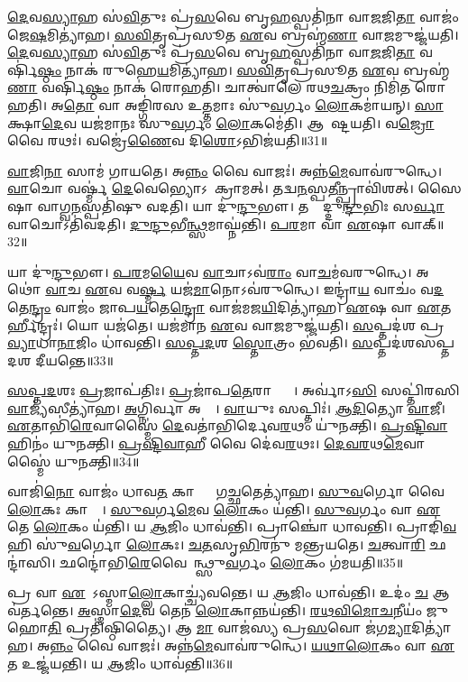 \ul{𑌦𑍇}𑌵\ul{𑌸𑍍𑌯𑌾}𑌹 𑌸॑\ul{𑌵𑌿}𑌤𑍁𑌃 𑌪𑍍𑌰॑\ul{𑌸}𑌵𑍇 𑌬𑍃\ul{𑌹}𑌸𑍍𑌪𑌤𑌿॑𑌨𑌾 𑌵𑌾\ul{𑌜}𑌜𑌿\ul{𑌤𑌾} 𑌵𑌾𑌜𑌂॑ 𑌜𑍇\ul{𑌷}𑌮𑌿𑌤𑍍𑌯𑌾॑𑌹।
\ul{𑌸}\ul{𑌵𑌿}𑌤𑍃𑌪𑍍𑌰॑𑌸𑍂𑌤 \ul{𑌏}𑌵 𑌬𑍍𑌰𑌹𑍍𑌮॑\ul{𑌣𑌾} 𑌵𑌾\ul{𑌜}𑌮𑍁𑌜𑍍𑌜॑𑌯𑌤𑌿।
\ul{𑌦𑍇}𑌵\ul{𑌸𑍍𑌯𑌾}𑌹 𑌸॑\ul{𑌵𑌿}𑌤𑍁𑌃 𑌪𑍍𑌰॑\ul{𑌸}𑌵𑍇 𑌬𑍃\ul{𑌹}𑌸𑍍𑌪𑌤𑌿॑𑌨𑌾 𑌵𑌾\ul{𑌜}𑌜𑌿\ul{𑌤𑌾} 𑌵𑌰𑍍\mbox{}𑌷𑌿॑\ul{𑌷𑍍𑌠𑌂} 𑌨𑌾𑌕॑ 𑌰𑍁𑌹𑍇\ul{𑌯}𑌮𑌿𑌤𑍍𑌯𑌾॑𑌹।
\ul{𑌸}\ul{𑌵𑌿}𑌤𑍃𑌪𑍍𑌰॑𑌸𑍂𑌤 \ul{𑌏}𑌵 𑌬𑍍𑌰𑌹𑍍𑌮॑\ul{𑌣𑌾} 𑌵𑌰𑍍\mbox{}𑌷𑌿॑\ul{𑌷𑍍𑌠𑌂} 𑌨𑌾𑌕॑ 𑌰𑍋𑌹𑌤𑌿।
𑌚𑌾𑌤𑍍𑌵𑌾॑𑌲𑍇 𑌰𑌥\ul{𑌚}𑌕𑍍𑌰𑌂 𑌨𑌿𑌮𑌿॑𑌤 𑌰𑍋𑌹𑌤𑌿।
𑌅\ul{𑌤𑍋} 𑌵𑌾 𑌅𑌙𑍍𑌗𑌿॑𑌰𑌸 𑌉\ul{𑌤𑍍𑌤}𑌮𑌾𑌃 𑌸𑍁॑\ul{𑌵}𑌰𑍍𑌗𑌂 \ul{𑌲𑍋}𑌕𑌮𑌾॑𑌯𑌨𑍍।
\ul{𑌸𑌾}𑌕𑍍𑌷𑌾\ul{𑌦𑍇}𑌵 𑌯𑌜॑𑌮𑌾𑌨𑌃 𑌸𑍁\ul{𑌵}𑌰𑍍𑌗𑌂 \ul{𑌲𑍋}𑌕𑌮𑍇॑𑌤𑌿।
𑌆𑌵𑍇᳚𑌷𑍍𑌟𑌯𑌤𑌿।
𑌵\ul{𑌜𑍍𑌰𑍋} 𑌵𑍈 𑌰𑌥𑌃॑।
𑌵𑌜𑍍𑌰𑍇॑\ul{𑌣𑍈}𑌵 𑌦𑌿\ul{𑌶𑍋}\-𑌽𑌭𑌿𑌜॑𑌯𑌤𑌿॥31॥

\ul{𑌵𑌾}𑌜𑌿\ul{𑌨𑌾}\ul{} 𑌸𑌾𑌮॑ 𑌗𑌾𑌯𑌤𑍇।
𑌅\ul{𑌨𑍍𑌨𑌂} 𑌵𑍈 𑌵𑌾𑌜𑌃॑।
𑌅𑌨𑍍𑌨॑\ul{𑌮𑍇}𑌵𑌾𑌵॑𑌰𑍁𑌨𑍍𑌧𑍇।
\ul{𑌵𑌾}𑌚𑍋 𑌵𑌰𑍍𑌷𑍍𑌮॑ \ul{𑌦𑍇}𑌵𑍇𑌭𑍍𑌯𑍋\-𑌽𑌪𑌾᳚𑌕𑍍𑌰𑌾𑌮𑌤𑍍।
𑌤𑌦𑍍𑌵\ul{𑌨}𑌸𑍍𑌪\ul{𑌤𑍀}𑌨𑍍𑌪𑍍𑌰𑌾𑌵𑌿॑𑌶𑌤𑍍।
𑌸𑍈𑌷𑌾 𑌵𑌾𑌗𑍍𑌵\ul{𑌨}𑌸𑍍𑌪𑌤𑌿॑𑌷𑍁 𑌵𑌦𑌤𑌿।
𑌯𑌾 𑌦𑍁॑\ul{𑌨𑍍𑌦𑍁}𑌭𑍗।
𑌤𑌸𑍍𑌮𑌾᳚𑌦𑍍𑌦𑍁\ul{𑌨𑍍𑌦𑍁}𑌭𑌿𑌃 𑌸\ul{𑌰𑍍𑌵𑌾} 𑌵𑌾𑌚𑍋\-𑌽𑌤𑌿॑𑌵𑌦𑌤𑌿।
\ul{𑌦𑍁}\ul{𑌨𑍍𑌦𑍁}𑌭𑍀\ul{𑌨𑍍𑌥𑍍𑌸}𑌮𑌾𑌘𑍍𑌨॑𑌨𑍍𑌤𑌿।
\ul{𑌪}\ul{𑌰}𑌮𑌾 𑌵𑌾 \ul{𑌏}𑌷𑌾 𑌵𑌾𑌕𑍍॥32॥

𑌯𑌾 𑌦𑍁॑\ul{𑌨𑍍𑌦𑍁}𑌭𑍗।
\ul{𑌪}\ul{𑌰}𑌮\ul{𑌯𑍈}𑌵 \ul{𑌵𑌾}𑌚𑌾\-𑌽𑌵॑\ul{𑌰𑌾𑌂} 𑌵𑌾\ul{𑌚}𑌮॑𑌵𑌰𑍁𑌨𑍍𑌧𑍇।
𑌅𑌥𑍋॑ \ul{𑌵𑌾}𑌚 \ul{𑌏}𑌵 𑌵\ul{𑌰𑍍𑌷𑍍𑌮} 𑌯𑌜॑\ul{𑌮𑌾}𑌨𑍋\-𑌽𑌵॑𑌰𑍁𑌨𑍍𑌧𑍇।
𑌇𑌨𑍍𑌦𑍍𑌰𑌾॑\ul{𑌯} 𑌵𑌾𑌚𑌂॑ 𑌵\ul{𑌦}𑌤𑍇\ul{𑌨𑍍𑌦𑍍𑌰𑌂} 𑌵𑌾𑌜𑌂॑ 𑌜𑌾𑌪\ul{𑌯}𑌤𑍇\ul{𑌨𑍍𑌦𑍍𑌰𑍋} 𑌵𑌾𑌜॑𑌮𑌜\ul{𑌯𑌿}𑌦𑌿𑌤𑍍𑌯𑌾॑𑌹।
\ul{𑌏}𑌷 𑌵𑌾 \ul{𑌏}𑌤𑌰𑍍\mbox{}𑌹𑍀𑌨𑍍𑌦𑍍𑌰𑌃॑।
𑌯𑍋 𑌯𑌜॑𑌤𑍇।
𑌯𑌜॑𑌮𑌾𑌨 \ul{𑌏}𑌵 𑌵𑌾\ul{𑌜}𑌮𑍁𑌜𑍍𑌜॑𑌯𑌤𑌿।
\ul{𑌸}𑌪𑍍𑌤𑌦॑𑌶 𑌪𑍍𑌰\ul{𑌵𑍍𑌯𑌾}𑌧𑌾\ul{𑌨𑌾}𑌜𑌿𑌂 𑌧𑌾॑𑌵𑌨𑍍𑌤𑌿।
\ul{𑌸}\ul{𑌪𑍍𑌤}\ul{𑌦}𑌶 \ul{𑌸𑍍𑌤𑍋}𑌤𑍍𑌰𑌂 𑌭॑𑌵𑌤𑌿।
\ul{𑌸}𑌪𑍍𑌤𑌦॑𑌶𑌸𑌪𑍍𑌤𑌦𑌶 𑌦𑍀𑌯𑌨𑍍𑌤𑍇॥33॥

\ul{𑌸}\ul{𑌪𑍍𑌤}\ul{𑌦}𑌶𑌃 \ul{𑌪𑍍𑌰}𑌜𑌾𑌪॑𑌤𑌿𑌃।
\ul{𑌪𑍍𑌰}𑌜𑌾॑𑌪\ul{𑌤𑍇}𑌰𑌾𑌪𑍍𑌤𑍍𑌯𑍈᳚।
𑌅𑌰𑍍𑌵𑌾॑𑌽\ul{𑌸𑌿} 𑌸𑌪𑍍𑌤𑌿॑𑌰𑌸𑌿 \ul{𑌵𑌾}𑌜𑍍𑌯॑𑌸𑍀𑌤𑍍𑌯𑌾॑𑌹।
\ul{𑌅}𑌗𑍍𑌨𑌿𑌰𑍍𑌵𑌾 𑌅𑌰𑍍𑌵𑌾᳚।
\ul{𑌵𑌾}𑌯𑍁𑌃 𑌸𑌪𑍍𑌤𑌿𑌃॑।
\ul{𑌆}\ul{𑌦𑌿}𑌤𑍍𑌯𑍋 \ul{𑌵𑌾}𑌜𑍀।
\ul{𑌏}𑌤𑌾𑌭𑌿॑\ul{𑌰𑍇}𑌵𑌾𑌸𑍍𑌮𑍈॑ \ul{𑌦𑍇}𑌵𑌤𑌾॑𑌭𑌿𑌰𑍍𑌦𑍇𑌵\ul{𑌰}𑌥𑌂 𑌯𑍁॑𑌨𑌕𑍍𑌤𑌿।
\ul{𑌪𑍍𑌰}\ul{𑌷𑍍𑌟𑌿}\ul{𑌵𑌾}𑌹𑌿𑌨𑌂॑ 𑌯𑍁𑌨𑌕𑍍𑌤𑌿।
\ul{𑌪𑍍𑌰}\ul{𑌷𑍍𑌟𑌿}\ul{𑌵𑌾}𑌹𑍀 𑌵𑍈 𑌦𑍇॑𑌵\ul{𑌰}𑌥𑌃।
\ul{𑌦𑍇}\ul{𑌵}\ul{𑌰}𑌥\ul{𑌮𑍇}𑌵𑌾𑌸𑍍𑌮𑍈॑ 𑌯𑍁𑌨𑌕𑍍𑌤𑌿॥34॥

𑌵𑌾𑌜𑌿॑\ul{𑌨𑍋} 𑌵𑌾𑌜𑌂॑ 𑌧𑌾𑌵\ul{𑌤} 𑌕𑌾𑌷𑍍𑌠𑌾𑌂᳚ 𑌗\ul{𑌚𑍍𑌛}𑌤𑍇𑌤𑍍𑌯𑌾॑𑌹।
\ul{𑌸𑍁}\ul{𑌵}𑌰𑍍𑌗𑍋 𑌵𑍈 \ul{𑌲𑍋}𑌕𑌃 𑌕𑌾𑌷𑍍𑌠𑌾᳚।
\ul{𑌸𑍁}\ul{𑌵}𑌰𑍍𑌗\ul{𑌮𑍇}𑌵 \ul{𑌲𑍋}𑌕𑌂 𑌯॑𑌨𑍍𑌤𑌿।
\ul{𑌸𑍁}\ul{𑌵}𑌰𑍍𑌗𑌂 𑌵𑌾 \ul{𑌏}𑌤𑍇 \ul{𑌲𑍋}𑌕𑌂 𑌯॑𑌨𑍍𑌤𑌿।
𑌯 \ul{𑌆}𑌜𑌿𑌂 𑌧𑌾𑌵॑𑌨𑍍𑌤𑌿।
𑌪𑍍𑌰𑌾𑌞𑍍𑌚𑍋॑ 𑌧𑌾𑌵𑌨𑍍𑌤𑌿।
𑌪𑍍𑌰𑌾𑌙𑌿॑\ul{𑌵} 𑌹𑌿 𑌸𑍁॑\ul{𑌵}𑌰𑍍𑌗𑍋 \ul{𑌲𑍋}𑌕𑌃।
\ul{𑌚}\ul{𑌤}𑌸𑍃\ul{𑌭𑌿}𑌰𑌨𑍁॑ 𑌮𑌨𑍍𑌤𑍍𑌰𑌯𑌤𑍇।
\ul{𑌚}𑌤𑍍𑌵𑌾\ul{𑌰𑌿} 𑌛𑌨𑍍𑌦𑌾॑𑌸𑌿।
𑌛𑌨𑍍𑌦𑍋॑𑌭𑌿\ul{𑌰𑍇}𑌵𑍈𑌨𑌾᳚𑌨𑍍𑌥𑍍𑌸𑍁\ul{𑌵}𑌰𑍍𑌗𑌂 \ul{𑌲𑍋}𑌕𑌂 𑌗॑𑌮𑌯𑌤𑌿॥35॥

𑌪𑍍𑌰 𑌵𑌾 \ul{𑌏}𑌤𑍇᳚\-𑌽𑌸𑍍𑌮𑌾\ul{𑌲𑍍𑌲𑍋}𑌕𑌾𑌚𑍍𑌚𑍍𑌯॑𑌵𑌨𑍍𑌤𑍇।
𑌯 \ul{𑌆}𑌜𑌿𑌂 𑌧𑌾𑌵॑𑌨𑍍𑌤𑌿।
𑌉𑌦𑌂॑ \ul{𑌚} 𑌆𑌵॑𑌰𑍍𑌤𑌨𑍍𑌤𑍇।
\ul{𑌅}𑌸𑍍𑌮𑌾\ul{𑌦𑍇}𑌵 𑌤𑍇𑌨॑ \ul{𑌲𑍋}𑌕𑌾𑌨𑍍𑌨𑌯॑𑌨𑍍𑌤𑌿।
\ul{𑌰}\ul{𑌥}\ul{𑌵𑌿}\ul{𑌮𑍋}\ul{𑌚}𑌨𑍀𑌯𑌂॑ 𑌜𑍁𑌹𑍋\ul{𑌤𑌿} 𑌪𑍍𑌰𑌤𑌿॑\-𑌷𑍍𑌠𑌿𑌤𑍍𑌯𑍈।
𑌆 \ul{𑌮𑌾} 𑌵𑌾𑌜॑𑌸𑍍𑌯 𑌪𑍍𑌰\ul{𑌸}𑌵𑍋 𑌜॑𑌗\ul{𑌮𑍍𑌯𑌾}𑌦𑌿𑌤𑍍𑌯𑌾॑𑌹।
𑌅\ul{𑌨𑍍𑌨𑌂} 𑌵𑍈 𑌵𑌾𑌜𑌃॑।
𑌅𑌨𑍍𑌨॑\ul{𑌮𑍇}𑌵𑌾𑌵॑𑌰𑍁𑌨𑍍𑌧𑍇।
\ul{𑌯}\ul{𑌥𑌾}\ul{𑌲𑍋}𑌕𑌂 𑌵𑌾 \ul{𑌏}𑌤 𑌉𑌜𑍍𑌜॑𑌯𑌨𑍍𑌤𑌿।
𑌯 \ul{𑌆}𑌜𑌿𑌂 𑌧𑌾𑌵॑𑌨𑍍𑌤𑌿॥36॥

